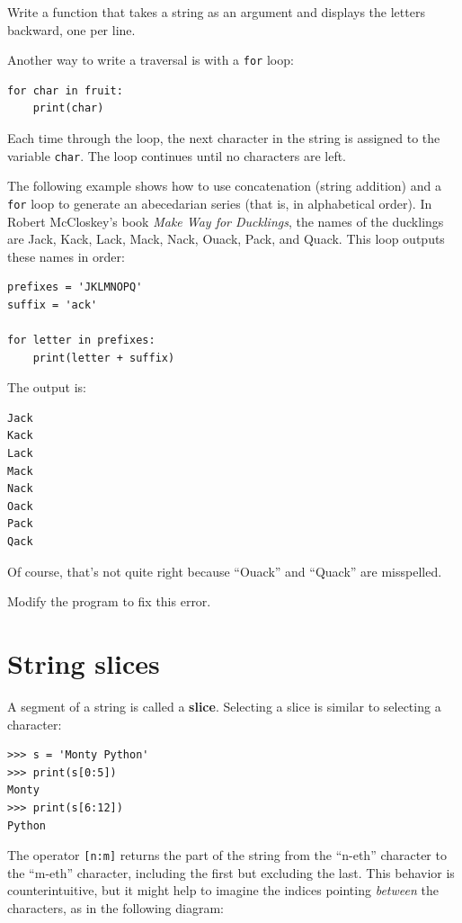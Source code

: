 \documentclass[10pt]{book}
\begin{document}
\begin{ex}
Write a function that takes a string as an argument
and displays the letters backward, one per line.
\end{ex}

Another way to write a traversal is with a {\tt for} loop:

\beforeverb
\begin{verbatim}
for char in fruit:
    print(char)
\end{verbatim}
\afterverb
%
Each time through the loop, the next character in the string is assigned
to the variable {\tt char}.  The loop continues until no characters are
left.


The following example shows how to use concatenation (string addition)
and a {\tt for} loop to generate an abecedarian series (that is, in
alphabetical order).  In Robert McCloskey's book {\em Make
Way for Ducklings}, the names of the ducklings are Jack, Kack, Lack,
Mack, Nack, Ouack, Pack, and Quack.  This loop outputs these names in
order:

\beforeverb
\begin{verbatim}
prefixes = 'JKLMNOPQ'
suffix = 'ack'

for letter in prefixes:
    print(letter + suffix)
\end{verbatim}
\afterverb
%
The output is:

\beforeverb
\begin{verbatim}
Jack
Kack
Lack
Mack
Nack
Oack
Pack
Qack
\end{verbatim}
\afterverb
%
Of course, that's not quite right because ``Ouack'' and
``Quack'' are misspelled.

\begin{ex}
Modify the program to fix this error.
\end{ex}



\section{String slices}
\label{slice}


A segment of a string is called a {\bf slice}.  Selecting a slice is
similar to selecting a character:

\beforeverb
\begin{verbatim}
>>> s = 'Monty Python'
>>> print(s[0:5])
Monty
>>> print(s[6:12])
Python
\end{verbatim}
\afterverb
%
The operator {\tt [n:m]} returns the part of the string from the 
``n-eth'' character to the ``m-eth'' character, including the first but
excluding the last.  This behavior is counterintuitive, but it might
help to imagine the indices pointing {\em between} the
characters, as in the following diagram:
\end{document}
